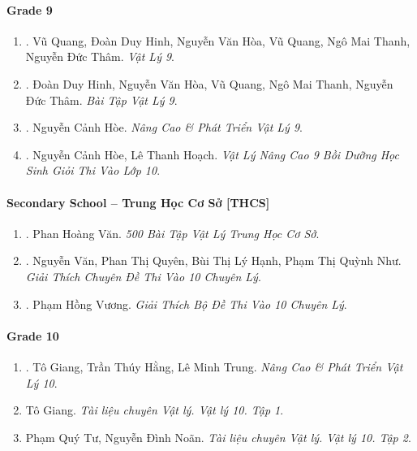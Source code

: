 \documentclass{article}
\begin{document}
\paragraph{Grade 9}

\begin{enumerate}
	\item \cite{SGK_Vat_Ly_9}. Vũ Quang, Đoàn Duy Hinh, Nguyễn Văn Hòa, Vũ Quang, Ngô Mai Thanh, Nguyễn Đức Thâm. {\it Vật Lý 9}.\hfill{\sf[reading]}
	\item \cite{SBT_Vat_Ly_9}. Đoàn Duy Hinh, Nguyễn Văn Hòa, Vũ Quang, Ngô Mai Thanh, Nguyễn Đức Thâm. {\it Bài Tập Vật Lý 9}.\hfill{\sf[reading]}
	\item \cite{Hoe_Vat_Ly_9}. Nguyễn Cảnh Hòe. {\it Nâng Cao \& Phát Triển Vật Lý 9}.\hfill{\sf[reading]}
	\item \cite{Hoe_Hoach_Vat_Ly_nang_cao_9}. Nguyễn Cảnh Hòe, Lê Thanh Hoạch. {\it Vật Lý Nâng Cao 9 Bồi Dưỡng Học Sinh Giỏi Thi Vào Lớp 10}.\hfill{\sf[reading]}
\end{enumerate}

\paragraph{Secondary School -- Trung Học Cơ Sở [THCS]}

\begin{enumerate}
	\item \cite{Van_500_BT_Vat_Ly_THCS}. Phan Hoàng Văn. {\it 500 Bài Tập Vật Lý Trung Học Cơ Sở}.\hfill{\sf[reading]}
	\item \cite{Van_Quyen_Hanh_Nhu_10_chuyen_Ly}. Nguyễn Văn, Phan Thị Quyên, Bùi Thị Lý Hạnh, Phạm Thị Quỳnh Như. {\it Giải Thích Chuyên Đề Thi Vào 10 Chuyên Lý}.\hfill{\sf[reading]}
	\item \cite{Vuong_10_chuyen_Ly}. Phạm Hồng Vương. {\it Giải Thích Bộ Đề Thi Vào 10 Chuyên Lý}.\hfill{\sf[reading]}
\end{enumerate}

\paragraph{Grade 10}

\begin{enumerate}
	\item \cite{Giang_Hang_Trung_ncpt_Vat_Ly_10}. Tô Giang, Trần Thúy Hằng, Lê Minh Trung. {\it Nâng Cao \& Phát Triển Vật Lý 10}.\hfill{\sf[reading]}
	\item Tô Giang. {\it Tài liệu chuyên Vật lý. Vật lý 10. Tập 1}.
	\item Phạm Quý Tư, Nguyễn Đình Noãn. {\it Tài liệu chuyên Vật lý. Vật lý 10. Tập 2}.
\end{enumerate}
\end{document}
